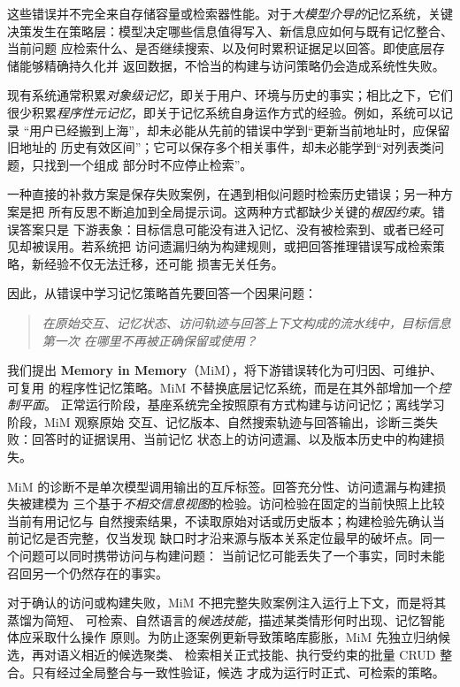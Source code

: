 \documentclass[UTF8,11pt]{ctexart}
\begin{document}
这些错误并不完全来自存储容量或检索器性能。对于\emph{大模型介导的}记忆系统，关键
决策发生在策略层：模型决定哪些信息值得写入、新信息应如何与既有记忆整合、当前问题
应检索什么、是否继续搜索、以及何时累积证据足以回答。即使底层存储能够精确持久化并
返回数据，不恰当的构建与访问策略仍会造成系统性失败。

现有系统通常积累\emph{对象级记忆}，即关于用户、环境与历史的事实；相比之下，它们
很少积累\emph{程序性元记忆}，即关于记忆系统自身运作方式的经验。例如，系统可以记录
“用户已经搬到上海”，却未必能从先前的错误中学到“更新当前地址时，应保留旧地址的
历史有效区间”；它可以保存多个相关事件，却未必能学到“对列表类问题，只找到一个组成
部分时不应停止检索”。

一种直接的补救方案是保存失败案例，在遇到相似问题时检索历史错误；另一种方案是把
所有反思不断追加到全局提示词。这两种方式都缺少关键的\emph{根因约束}。错误答案只是
下游表象：目标信息可能没有进入记忆、没有被检索到、或者已经可见却被误用。若系统把
访问遗漏归纳为构建规则，或把回答推理错误写成检索策略，新经验不仅无法迁移，还可能
损害无关任务。

因此，从错误中学习记忆策略首先要回答一个因果问题：

\begin{quote}
\emph{在原始交互、记忆状态、访问轨迹与回答上下文构成的流水线中，目标信息第一次
在哪里不再被正确保留或使用？}
\end{quote}

我们提出 \textbf{Memory in Memory}（MiM），将下游错误转化为可归因、可维护、可复用
的程序性记忆策略。MiM 不替换底层记忆系统，而是在其外部增加一个\emph{控制平面}。
正常运行阶段，基座系统完全按照原有方式构建与访问记忆；离线学习阶段，MiM 观察原始
交互、记忆版本、自然搜索轨迹与回答输出，诊断三类失败：回答时的证据误用、当前记忆
状态上的访问遗漏、以及版本历史中的构建损失。

MiM 的诊断不是单次模型调用输出的互斥标签。回答充分性、访问遗漏与构建损失被建模为
三个基于\emph{不相交信息视图}的检验。访问检验在固定的当前快照上比较当前有用记忆与
自然搜索结果，不读取原始对话或历史版本；构建检验先确认当前记忆是否完整，仅当发现
缺口时才沿来源与版本关系定位最早的破坏点。同一个问题可以同时携带访问与构建问题：
当前记忆可能丢失了一个事实，同时未能召回另一个仍然存在的事实。

对于确认的访问或构建失败，MiM 不把完整失败案例注入运行上下文，而是将其蒸馏为简短、
可检索、自然语言的\emph{候选技能}，描述某类情形何时出现、记忆智能体应采取什么操作
原则。为防止逐案例更新导致策略库膨胀，MiM 先独立归纳候选，再对语义相近的候选聚类、
检索相关正式技能、执行受约束的批量 CRUD 整合。只有经过全局整合与一致性验证，候选
才成为运行时正式、可检索的策略。
\end{document}
